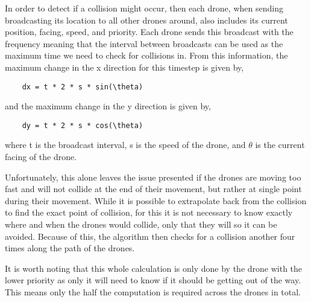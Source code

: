 In order to detect if a collision might occur, then each drone, when sending broadcasting its location to all other drones around, also includes its current position, facing, speed, and priority. Each drone sends this broadcast with the frequency meaning that the interval between broadcasts can be used as the maximum time we need to check for collisions in. From this information, the maximum change in the x direction for this timestep is given by,
\begin{verbatim}
	dx = t * 2 * s * sin(\theta)
\end{verbatim}
and the maximum change in the y direction is given by,
\begin{verbatim}
	dy = t * 2 * s * cos(\theta)
\end{verbatim}
where t is the broadcast interval, s is the speed of the drone, and $\theta$ is the current facing of the drone.

Unfortunately, this alone leaves the issue presented if the drones are moving too fast and will not collide at the end of their movement, but rather at single point during their movement. While it is possible to extrapolate back from the collision to find the exact point of collision, for this it is not necessary to know exactly where and when the drones would collide, only that they will so it can be avoided. Because of this, the algorithm then checks for a collision another four times along the path of the drones.

It is worth noting that this whole calculation is only done by the drone with the lower priority as only it will need to know if it should be getting out of the way. This means only the half the computation is required across the drones in total.